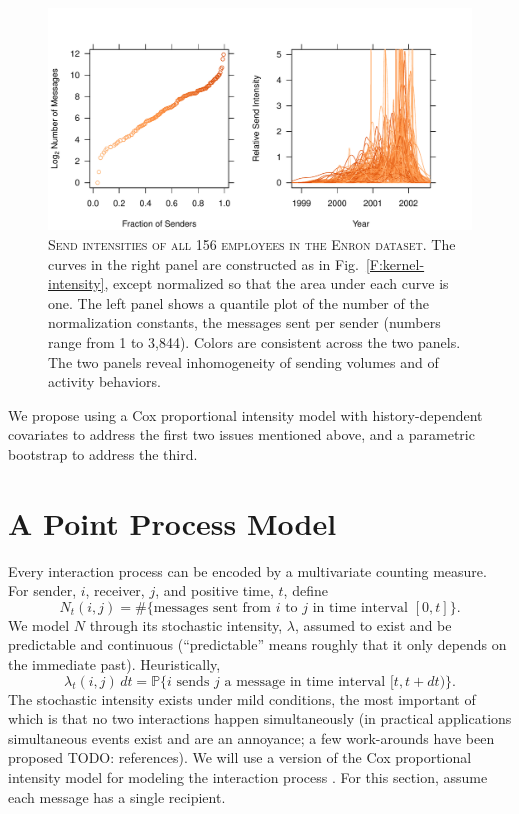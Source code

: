 \documentclass[aoas,preprint]{imsart}
\begin{document}
\begin{figure}
    \includegraphics[scale=0.6]{figures/send-intensities}
    \caption{
        \textsc{Send intensities of all 156 employees in the Enron
        dataset.}  The curves in the right panel are constructed as in
        Fig.~\ref{F:kernel-intensity}, except normalized so that the
        area under each curve is one.   The left panel shows a quantile plot
        of the number of the normalization constants,
        the messages sent per sender (numbers range from 1 to 3,844).
        Colors are consistent across the two panels. 
        The two panels reveal inhomogeneity of sending volumes and of
        activity behaviors.
    }
    \label{F:send-intensities}
\end{figure}

We propose using a Cox proportional intensity model with history-dependent
covariates to address the first two issues mentioned above, and a parametric
bootstrap to address the third.

\section{A Point Process Model}\label{S:point-process-model}

Every interaction process can be encoded by a multivariate counting measure.
For sender, $i$, receiver, $j$, and positive time, $t$, define
\[
    N_t(i,j)
        =
        \#\{\text{messages sent from $i$ to $j$ in time interval $[0,t]$}\}.
\]
We model $N$ through its stochastic intensity, $\lambda$, assumed to
exist and be predictable and continuous (``predictable'' means roughly that
it only depends on the immediate past).  Heuristically,
\[
    \lambda_t(i,j) \, dt
        =
        \mathbb{P}\{
            \text{$i$ sends $j$ a message in time interval $[t,t+dt)$}
        \}.
\]
The stochastic intensity exists under mild conditions, the most important of
which is that no two interactions happen simultaneously (in practical
applications simultaneous events exist and are an annoyance; a few 
work-arounds have been proposed {TODO: references}).  We will use a version
of the Cox proportional intensity model for modeling the interaction process
\cite{cox1972regression}.  For this section, assume each message has a
single recipient.
\end{document}

